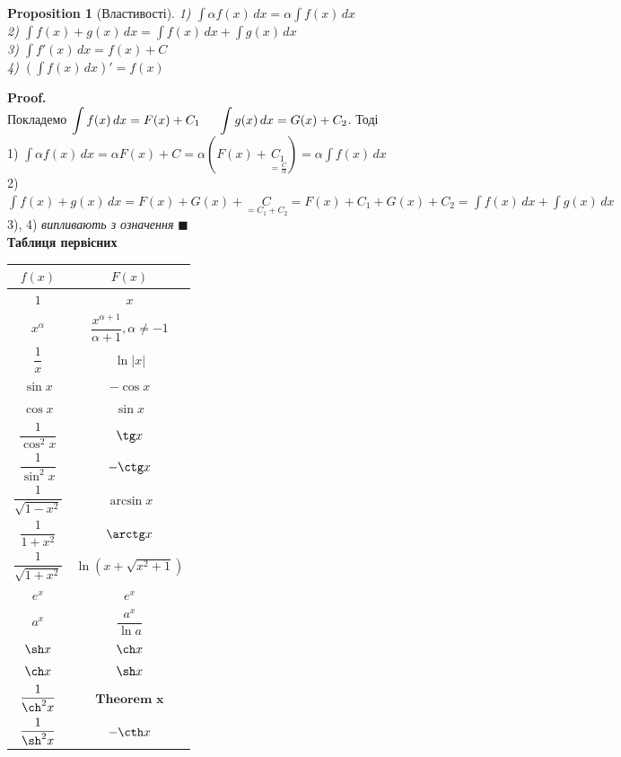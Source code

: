 \documentclass[a4paper, 14pt]{extarticle}
\def\huge{\displaystyle}
\def\bigline{\vspace{5mm}\\}
\def\th#1{\textbf{Theorem {#1}}}
\theoremstyle{theoremdd}
\theoremstyle{theoremdd}
\theoremstyle{theoremdd}
\theoremstyle{theoremdd}
\theoremstyle{theoremdd}
\newtheorem{proposition}[theorem]{Proposition}
\theoremstyle{theoremdd}
\theoremstyle{theoremdd}
\theoremstyle{theoremdd}
\newenvironment{pf}{\vspace*{-3mm} \textbf{Proof. \\}}{$\blacksquare$}
\begin{document}
\begin{proposition}[Властивості]
1) $\huge \int \alpha f(x)\,dx = \alpha \int f(x)\,dx$\\
2) $\huge \int f(x) + g(x) \,dx = \int f(x)\,dx + \int g(x)\,dx$\\
3) $\huge \int f'(x)\,dx = f(x) + C$\\
4) $\huge \left(\int f(x)\,dx \right)' = f(x)$
\end{proposition}

\begin{pf}
Покладемо $\huge \int f(x)\,dx = F(x) + C_1 \hspace{0.5cm} \int g(x)\,dx = G(x) + C_2$. Тоді\\
1) $\huge \int \alpha f(x)\,dx = \alpha F(x) + C = \alpha (F(x) + \underset{=\frac{C}{\alpha}}{C_1}) = \alpha \int f(x)\,dx$
\bigline
2) $\huge \int f(x) + g(x) \,dx = F(x) + G(x) + \underset{=C_1+C_2}{C} = F(x) + C_1 + G(x) + C_2 = \int f(x)\,dx + \int g(x)\,dx$
\bigline
3), 4) \textit{випливають з означення}
\end{pf}
\\
\textbf{Таблиця первісних}
\begin{center}
\begin{tabular}{ c|c } 
 $f(x)$ & $F(x)$ \\
 \hline 
 $1$ & $x$ \\ [2ex]
 \hline 
 $x^\alpha$ & $\dfrac{x^{\alpha+1}}{\alpha+1}, \alpha \neq -1$ \\ [2ex]
 \hline
 $\dfrac{1}{x}$ & $\ln |x|$ \\ [2ex]
 \hline
 $\sin x$ & $-\cos x$\\ [2ex]
 \hline 
 $\cos x$ & $\sin x$\\ [2ex]
 \hline
 $\dfrac{1}{\cos^2 x}$ & $\tg x$\\ [2ex]
 \hline 
 $\dfrac{1}{\sin^2 x}$ & $-\ctg x$\\ [2ex]
 \hline
 $\dfrac{1}{\sqrt{1-x^2}}$ & $\arcsin x$\\ [2ex]
 \hline
 $\dfrac{1}{1+x^2}$ & $\arctg x$\\ [2ex]
 \hline
 $\dfrac{1}{\sqrt{1+x^2}}$ & $\ln(x+\sqrt{x^2+1})$\\ [2ex]
 \hline
 $e^x$ & $e^x$ \\ [2ex]
 \hline 
 $a^x$ & $\dfrac{a^x}{\ln a}$ \\ [2ex]
 \hline
 $\sh x$ & $\ch x$ \\ [2ex]
 \hline
 $\ch x$ & $\sh x$ \\ [2ex]
 \hline
 $\dfrac{1}{\ch^2 x}$ & $\th x$\\ [2ex]
 \hline
 $\dfrac{1}{\sh^2 x}$ & $-\cth x$\\
\end{tabular}
\end{center}
\end{document}
